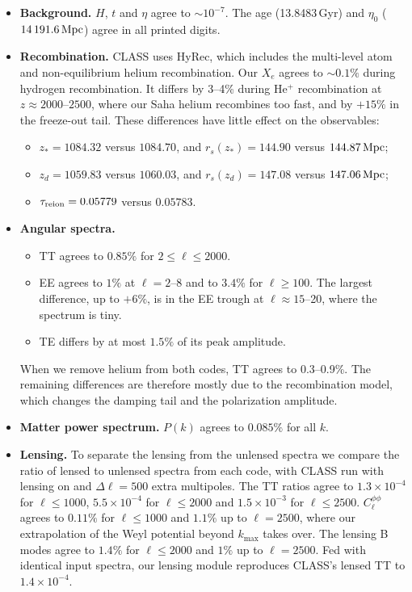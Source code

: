 \begin{itemize}
\item \textbf{Background.} $H$, $t$ and $\eta$ agree to $\sim10^{-7}$. The age (13.8483\,Gyr) and $\eta_0$
      ($14\,191.6\,\mathrm{Mpc}$) agree in all printed digits.
\item \textbf{Recombination.} CLASS uses HyRec, which includes the multi-level atom and non-equilibrium helium
      recombination. Our $X_e$ agrees to $\sim0.1\%$ during hydrogen recombination. It differs by 3--4\% during
      He$^+$ recombination at $z\approx2000$--$2500$, where our Saha helium recombines too fast, and by $+15\%$ in the
      freeze-out tail. These differences have little effect on the observables:
      \begin{itemize}
      \item $z_*=1084.32$ versus $1084.70$, and $r_s(z_*)=144.90$ versus $144.87\,\mathrm{Mpc}$;
      \item $z_d=1059.83$ versus $1060.03$, and $r_s(z_d)=147.08$ versus $147.06\,\mathrm{Mpc}$;
      \item $\tau_{\rm reion}=0.05779$ versus $0.05783$.
      \end{itemize}
\item \textbf{Angular spectra.}
      \begin{itemize}
      \item TT agrees to $0.85\%$ for $2\le\ell\le2000$.
      \item EE agrees to $1\%$ at $\ell=2$--8 and to $3.4\%$ for $\ell\ge100$. The largest difference, up to $+6\%$, is
            in the EE trough at $\ell\approx15$--20, where the spectrum is tiny.
      \item TE differs by at most $1.5\%$ of its peak amplitude.
      \end{itemize}
      When we remove helium from both codes, TT agrees to 0.3--0.9\%. The remaining differences are therefore mostly
      due to the recombination model, which changes the damping tail and the polarization amplitude.
\item \textbf{Matter power spectrum.} $P(k)$ agrees to $0.085\%$ for all $k$.
\item \textbf{Lensing.} To separate the lensing from the unlensed spectra we compare the ratio of lensed to unlensed
      spectra from each code, with CLASS run with lensing on and $\Delta\ell=500$ extra multipoles. The TT ratios
      agree to $1.3\times10^{-4}$ for $\ell\le1000$, $5.5\times10^{-4}$ for $\ell\le2000$ and $1.5\times10^{-3}$ for
      $\ell\le2500$. $C_\ell^{\phi\phi}$ agrees to $0.11\%$ for $\ell\le1000$ and $1.1\%$ up to $\ell=2500$, where our
      extrapolation of the Weyl potential beyond $k_{\max}$ takes over. The lensing B modes agree to $1.4\%$ for
      $\ell\le2000$ and $1\%$ up to $\ell=2500$. Fed with identical input spectra, our lensing module reproduces CLASS's lensed TT to $1.4\times10^{-4}$.
\end{itemize}

